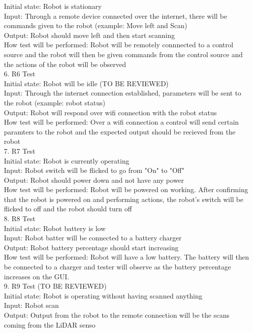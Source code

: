 \documentclass[12pt, titlepage]{article}
\begin{document}
\begin{enumerate}
Initial state: Robot is stationary \\
Input: Through a remote device connected over the internet, there will be commands given to the robot (example: Move left and Scan) \\
Output: Robot should move left and then start scanning  \\
How test will be performed: Robot will be remotely connnected to a control source and the robot will then be given commands from the control source and the actions of the robot will be observed \\
6.	R6 Test \\
Initial state: Robot will be idle (TO BE REVIEWED) \\
Input: Through the internet connection established, parameters will be sent to the robot (example: robot status) \\
Output: Robot will respond over wifi connection with the robot status  \\
How test will be performed: Over a wifi connection a control will send certain paramters to the robot and the expected output should be recieved from the robot \\
7.	R7 Test \\
Initial state: Robot is currently operating \\
Input: Robot switch will be flicked to go from "On" to "Off"\\
Output: Robot should power down and not have any power \\
How test will be performed: Robot will be powered on working. After confirming that the robot is powered on and performing actions, the robot's switch will be flicked to off and the robot should turn off \\
8.	R8 Test \\
Initial state: Robot battery is low \\
Input: Robot batter will be connected to a battery charger \\
Output: Robot battery percentage should start increasing \\
How test will be performed: Robot will have a low battery. The battery will then be connected to a charger and tester will observe as the battery percentage increases on the GUI.\\
9.	R9 Test (TO BE REVIEWED)\\
Initial state: Robot is operating without having scanned anything \\
Input: Robot scan\\
Output: Output from the robot to the remote connection will be the scans coming from the LiDAR senso\\

\end{enumerate}
\end{document}
